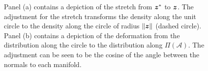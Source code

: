 \documentclass[12pt]{article}
\newcommand{\bz}{\mbox{\boldmath $z$}}
\begin{document}
\begin{figure}
\centering
\captionsetup{justification=centering}
\quad
{}
\caption{Panel (a) contains a depiction of the stretch from $\bz^{*}$
  to $\bz$. The adjustment for the stretch transforms the density
  along the unit circle to the density along the circle of radius
  $\|\bz\|$ (dashed circle).  Panel (b) contains a depiction of the
  deformation from the distribution along the circle to the
  distribution along $\Pi(\mathcal{A})$. The adjustment can be seen to
  be the cosine of the angle between the normals to each manifold.}
\label{fig:stretchDeform}
\end{figure}
\end{document}
